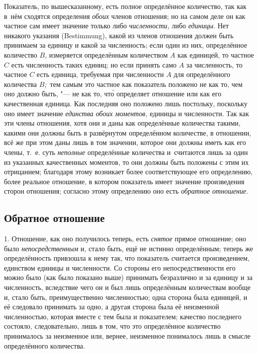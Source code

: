 Показатель, по вышесказанному, есть полное определённое количество, так как
в~нём сходятся определения {\em обоих} членов отношения; но на самом деле он
как частное сам имеет значение только либо {\em численности,} либо
{\em единицы}. Нет никакого указания (Bestimmung), какой из членов отношения
должен быть принимаем за единицу и какой за численность; если один из них,
определённое количество $B$, измеряется определённым количеством $A$ как
единицей, то частное $C$ есть численность таких единиц; но если принять само
$A$ за численность, то частное $C$ есть единица, требуемая при численности $A$
для определённого количества $B${\em ;\,} тем самым это частное как показатель
положено не как то, чем оно должно быть, "--- не как то, чт\'{о} определяет
отношение или как его качественная единица. Как последняя оно положено лишь
постольку, поскольку оно имеет значение {\em единства обоих моментов,} единицы
и численности. Так как эти члены отношения, хотя они и даны как определённые
количества такими, какими они должны быть в развёрнутом определённом
количестве, в отношении, всё же при этом даны лишь в том значении, которое они
должны иметь как его члены, т.~е. суть {\em неполные} определённые количества
и~считаются лишь за один из указанных качественных моментов, то они должны быть
положены с этим их отрицанием; благодаря этому возникает более соответствующее
его определению, более реальное отношение, в котором показатель имеет значение
произведения сторон отношения; согласно этому определению оно есть
{\em обратное отношение}.

\subsection{Обратное отношение}

1. Отношение, как оно получилось теперь, есть {\em снятое} прямое отношение;
оно было {\em непосредственным} и, стало быть, ещё не истинно определённым;
теперь же определённость привзошла к нему так, что показатель считается
произведением, единством единицы и численности. Со стороны его
непосредственности его можно было (как было показано выше) принимать
безразлично и за единицу и за численность, вследствие чего он и был лишь
определённым количествам вообще и, стало быть, преимущественно численностью;
одна сторона была единицей, и её следовало принимать за одно, а другая сторона
была её неизменной численностью, которая вместе с тем была и показателем;
качество последнего состояло, следовательно, лишь в том, что это определённое
количество принималось за неизменное или, вернее, неизменное понималось лишь в
смысле определённого количества.

